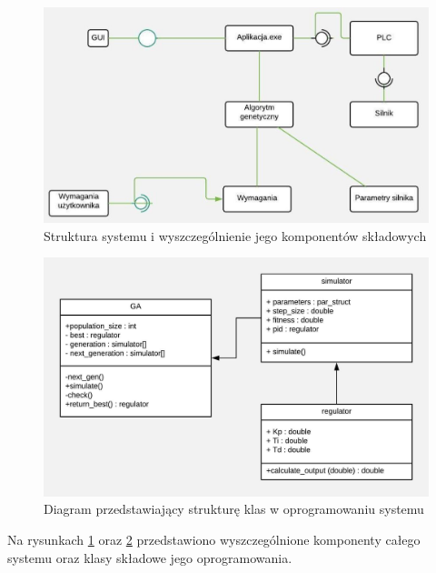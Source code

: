 \begin{figure}[ht!]
\centering
\includegraphics[scale=0.5]{komponent}
\caption{Struktura systemu i wyszczególnienie jego komponentów składowych}
\label{komponent}
\end{figure} 
\newpage
\begin{figure}[h!]
\centering
\includegraphics[scale=0.25]{klasa}
\caption{Diagram przedstawiający strukturę klas w oprogramowaniu systemu}
\label{klasa}
\end{figure}
Na rysunkach \ref{komponent} oraz \ref{klasa} przedstawiono wyszczególnione komponenty całego systemu oraz klasy składowe jego oprogramowania.\
